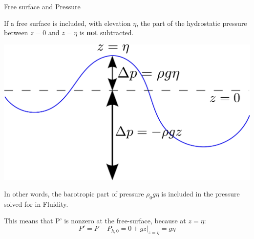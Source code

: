 \documentclass[12pt]{beamer}
\renewcommand\emph[1]{{\bf #1}}
\begin{document}
\begin{frame}{Free surface and Pressure}
  \begin{minipage}{0.5\textwidth}
    If a free surface is included, with elevation $\eta$, the
    part of the hydrostatic pressure between $z=0$ and $z=\eta$ is \emph{not}
    subtracted.
  \end{minipage}%
  \hspace{0.05\textwidth}%
  \begin{minipage}{0.45\textwidth}
    \includegraphics[width=\textwidth]{fs1}
  \end{minipage}
  
  \vspace{1em}
  In other words, the barotropic part of pressure $\rho_0g\eta$ is
  included in the pressure solved for in Fluidity.

  \vspace{1em}
  This means that P' is nonzero at the free-surface, because at $z=\eta$:
  \begin{equation*}
    P' = P-P_{h,0} = 0 + gz |_{z=\eta} = g\eta
  \end{equation*}
\end{frame}
\end{document}
